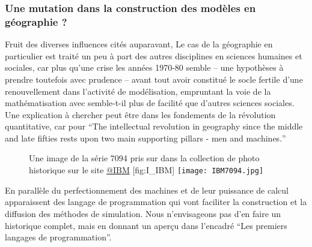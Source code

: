 
\subsubsection{Une mutation dans la construction des modèles en géographie ?}
\label{ssec:crise_mutation}

Fruit des diverses influences cités auparavant, Le cas de la géographie en particulier est traité un peu à part des autres disciplines en sciences humaines et sociales, car plus qu'une crise les années 1970-80 semble -- une hypothèses à prendre toutefois avec prudence -- avant tout avoir constitué le socle fertile d'une renouvellement dans l'activité de modélisation, empruntant la voie de la mathématisation avec semble-t-il plus de facilité que d'autres sciences sociales. Une explication à chercher peut être dans les fondements de la révolution quantitative, car pour \textcite{Gould1970} \foreignquote{english}{The intellectual revolution in geography since the middle and late fifties rests upon two main supporting pillars - men and machines.}

\begin{figure}[h]
\begin{sidecaption}[fortoc]{Une image de la série 7094 pris sur dans la collection de photo historique sur le site \href{http://www-03.ibm.com/ibm/history/exhibits/mainframe/mainframe_album.html}{@IBM} }[fig:I_IBM]
  \centering
 \texttt{[image: IBM7094.jpg]}
  \end{sidecaption}
\end{figure}

En parallèle du perfectionnement des machines et de leur puissance de calcul apparaissent des langage de programmation qui vont faciliter la construction et la diffusion des méthodes de simulation. Nous n'envisageons pas d'en faire un historique complet, mais en donnant un aperçu dans l'encadré \enquote{Les premiers langages de programmation}.


